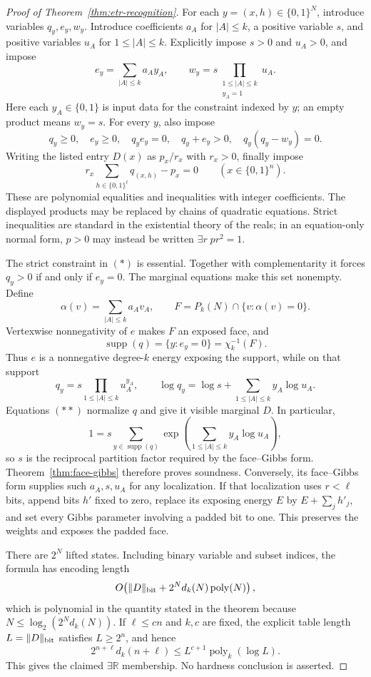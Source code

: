 \documentclass{article}
\newcommand{\supp}{\operatorname{supp}}
\newcommand{\bits}{\{0,1\}}
\begin{document}
\begin{proof}[Proof of Theorem~\ref{thm:etr-recognition}]
For each $y=(x,h)\in\bits^N$, introduce variables $q_y,e_y,w_y$.
Introduce coefficients $a_A$ for $|A|\le k$, a positive variable $s$, and
positive variables $u_A$ for $1\le |A|\le k$.  Explicitly impose
$s>0$ and $u_A>0$, and impose
\[
  e_y=\sum_{|A|\le k}a_Ay_A,
  \qquad
  w_y=s\prod_{\substack{1\le |A|\le k\\y_A=1}}u_A.
\]
Here each $y_A\in\{0,1\}$ is input data for the constraint indexed by $y$;
an empty product means $w_y=s$.  For every $y$, also impose
\[
  q_y\ge0,\quad e_y\ge0,\quad q_ye_y=0,\quad q_y+e_y>0,
  \quad q_y(q_y-w_y)=0.
  \tag{\(*\)}
\]
Writing the listed entry $D(x)$ as $p_x/r_x$ with $r_x>0$, finally impose
\[
  r_x\sum_{h\in\bits^\ell}q_{(x,h)}-p_x=0
  \qquad(x\in\bits^n).
  \tag{\(**\)}
\]
These are polynomial equalities and inequalities with integer coefficients.
The displayed products may be replaced by chains of quadratic equations.
Strict inequalities are standard in the existential theory of the reals; in
an equation-only normal form, $p>0$ may instead be written
$\exists r\;pr^2=1$.

The strict constraint in $(*)$ is essential.  Together with complementarity
it forces $q_y>0$ if and only if $e_y=0$.  The marginal equations make this
set nonempty.  Define
\[
  \alpha(v)=\sum_{|A|\le k}a_Av_A,
  \qquad
  F=P_k(N)\cap\{v:\alpha(v)=0\}.
\]
Vertexwise nonnegativity of $e$ makes $F$ an exposed face, and
\[
  \supp(q)=\{y:e_y=0\}=\chi_k^{-1}(F).
\]
Thus $e$ is a nonnegative degree-$k$ energy exposing the support, while on
that support
\[
  q_y=s\prod_{1\le |A|\le k}u_A^{y_A},
  \qquad
  \log q_y=\log s+\sum_{1\le |A|\le k}y_A\log u_A.
\]
Equations $(**)$ normalize $q$ and give it visible marginal $D$.
In particular,
\[
  1=s\sum_{y\in\supp(q)}
  \exp\!\left(\sum_{1\le |A|\le k}y_A\log u_A\right),
\]
so $s$ is the reciprocal partition factor required by the face--Gibbs form.
Theorem~\ref{thm:face-gibbs} therefore proves soundness.  Conversely, its
face--Gibbs form supplies such $a_A,s,u_A$ for any localization.  If that
localization uses $r<\ell$ bits, append bits $h'$ fixed to zero, replace its
exposing energy $E$ by $E+\sum_jh'_j$, and set every Gibbs parameter involving
a padded bit to one.  This preserves the weights and exposes the padded face.

There are $2^N$ lifted states.  Including binary variable and subset indices,
the formula has encoding length
\[
  O\!\left(\lVert D\rVert_{\rm bit}
  +2^Nd_k(N)\operatorname{poly}(N)\right),
\]
which is polynomial in the quantity stated in the theorem because
$N\le\log_2(2^Nd_k(N))$.
If $\ell\le cn$ and $k,c$ are fixed, the explicit table length
$L=\lVert D\rVert_{\rm bit}$ satisfies $L\ge2^n$, and hence
\[
  2^{n+\ell}d_k(n+\ell)
  \le L^{c+1}\operatorname{poly}_k(\log L).
\]
This gives the claimed $\exists\mathbb R$ membership.  No hardness conclusion
is asserted.
\end{proof}
\end{document}
